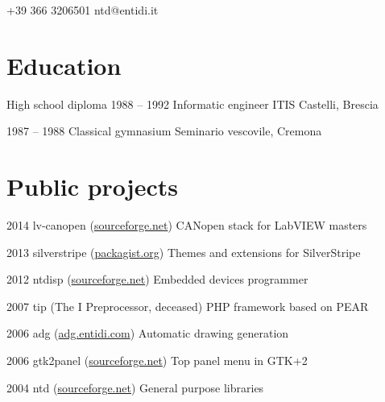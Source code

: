 \documentclass[fontsize=10pt]{tccv}
\begin{document}
    {+39 366 3206501}
    {ntd@entidi.it}

\section{Education}

\begin{yearlist}

\item[High school diploma]{1988 -- 1992}
     {Informatic engineer}
     {ITIS Castelli, Brescia}

\item{1987 -- 1988}
     {Classical gymnasium}
     {Seminario vescovile, Cremona}

\end{yearlist}

\section{Public projects}

\begin{yearlist}

\item{2014}
     {lv-canopen (\href{https://sourceforge.net/projects/lv-canopen/}{sourceforge.net})}
     {CANopen stack for LabVIEW masters}

\item{2013}
     {silverstripe (\href{https://packagist.org/packages/entidi/}{packagist.org})}
     {Themes and extensions for SilverStripe}

\item{2012}
     {ntdisp (\href{https://sourceforge.net/projects/ntdisp/}{sourceforge.net})}
     {Embedded devices programmer}

\item{2007}
     {tip (The I Preprocessor, deceased)}
     {PHP framework based on PEAR}

\item{2006}
     {adg (\href{https://adg.entidi.com/}{adg.entidi.com})}
     {Automatic drawing generation}

\item{2006}
     {gtk2panel (\href{https://sourceforge.net/projects/gtk2panel/}{sourceforge.net})}
     {Top panel menu in GTK+2}

\item{2004}
     {ntd (\href{https://sourceforge.net/projects/ntd/}{sourceforge.net})}
     {General purpose libraries}

\end{yearlist}
\end{document}
